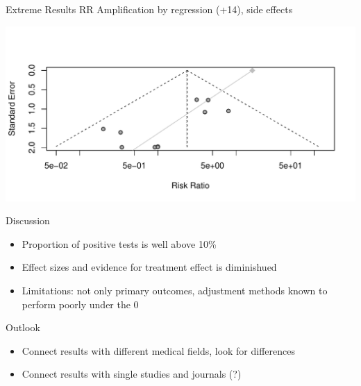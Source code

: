\documentclass[english]{beamer}\usepackage[]{graphicx}\usepackage[]{color}
\makeatletter
\def\maxwidth{ %
  \ifdim\Gin@nat@width>\linewidth
    \linewidth
  \else
    \Gin@nat@width
  \fi
}
\newenvironment{kframe}{%
 \def\at@end@of@kframe{}%
 \ifinner\ifhmode%
  \def\at@end@of@kframe{\end{minipage}}%
  \begin{minipage}{\columnwidth}%
 \fi\fi%
 \def\FrameCommand##1{\hskip\@totalleftmargin \hskip-\fboxsep
 \colorbox{shadecolor}{##1}\hskip-\fboxsep
     \hskip-\linewidth \hskip-\@totalleftmargin \hskip\columnwidth}%
 \MakeFramed {\advance\hsize-\width
   \@totalleftmargin\z@ \linewidth\hsize
   \@setminipage}}%
 {\par\unskip\endMakeFramed%
 \at@end@of@kframe}
\newenvironment{knitrout}{}{} %
\makeatother
\begin{document}
\begin{frame}[fragile]{Extreme Results}
RR Amplification by regression (+14), side effects

\begin{knitrout}
\color{fgcolor}\begin{kframe}


{\ttfamily\noindent\color{warningcolor}{\#\# Warning in summary.lm(reg): essentially perfect fit: summary may be unreliable}}

{\ttfamily\noindent\color{warningcolor}{\#\# Warning in summary.lm(reg): essentially perfect fit: summary may be unreliable}}\end{kframe}
\includegraphics[width=\maxwidth]{figure/unnamed-chunk-22-1} 

\end{knitrout}
\end{frame}

\begin{frame}[fragile]{Discussion}
\begin{itemize}
\item Proportion of positive tests is well above 10\%
\item Effect sizes and evidence for treatment effect is diminishued
\item Limitations: not only primary outcomes, adjustment methods known to
perform poorly under the 0
\end{itemize}
\end{frame}


\begin{frame}[fragile]{Outlook}
\begin{itemize}
\item Connect results with different medical fields, look for differences
\item Connect results with single studies and journals (?)
\end{itemize}
\end{frame}
\end{document}
